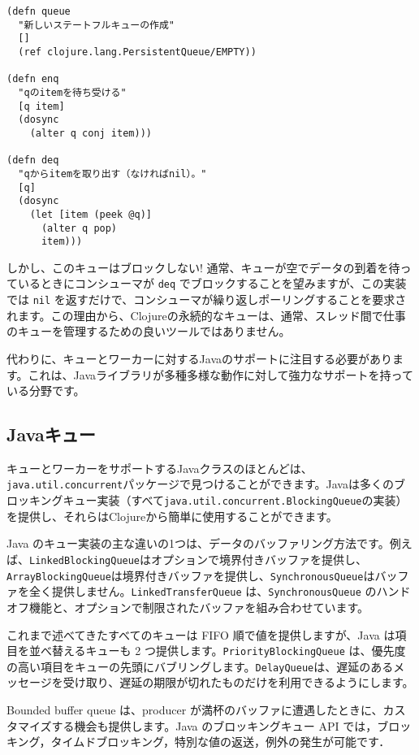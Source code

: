 \begin{lstlisting}[numbers=none]
(defn queue
  "新しいステートフルキューの作成"
  []
  (ref clojure.lang.PersistentQueue/EMPTY))

(defn enq
  "qのitemを待ち受ける"
  [q item]
  (dosync
    (alter q conj item)))

(defn deq
  "qからitemを取り出す（なければnil）。"
  [q]
  (dosync
    (let [item (peek @q)]
      (alter q pop)
      item)))
\end{lstlisting}

しかし、このキューはブロックしない! 通常、キューが空でデータの到着を待っているときにコンシューマが \texttt{deq} でブロックすることを望みますが、この実装では \texttt{nil} を返すだけで、コンシューマが繰り返しポーリングすることを要求されます。この理由から、Clojureの永続的なキューは、通常、スレッド間で仕事のキューを管理するための良いツールではありません。

代わりに、キューとワーカーに対するJavaのサポートに注目する必要があります。これは、Javaライブラリが多種多様な動作に対して強力なサポートを持っている分野です。

\subsection{Javaキュー}

キューとワーカーをサポートするJavaクラスのほとんどは、\texttt{java.util.concurrent}パッケージで見つけることができます。Javaは多くのブロッキングキュー実装（すべて\texttt{java.util.concurrent.BlockingQueue}の実装）を提供し、それらはClojureから簡単に使用することができます。

Java のキュー実装の主な違いの1つは、データのバッファリング方法です。例えば、\texttt{LinkedBlockingQueue}はオプションで境界付きバッファを提供し、\texttt{ArrayBlockingQueue}は境界付きバッファを提供し、\texttt{SynchronousQueue}はバッファを全く提供しません。\texttt{LinkedTransferQueue} は、\texttt{SynchronousQueue} のハンドオフ機能と、オプションで制限されたバッファを組み合わせています。

これまで述べてきたすべてのキューは FIFO 順で値を提供しますが、Java は項目を並べ替えるキューも 2 つ提供します。\texttt{PriorityBlockingQueue} は、優先度の高い項目をキューの先頭にバブリングします。\texttt{DelayQueue}は、遅延のあるメッセージを受け取り、遅延の期限が切れたものだけを利用できるようにします。

Bounded buffer queue は、producer が満杯のバッファに遭遇したときに、カスタマイズする機会も提供します。Java のブロッキングキュー API では，ブロッキング，タイムドブロッキング，特別な値の返送，例外の発生が可能です．

